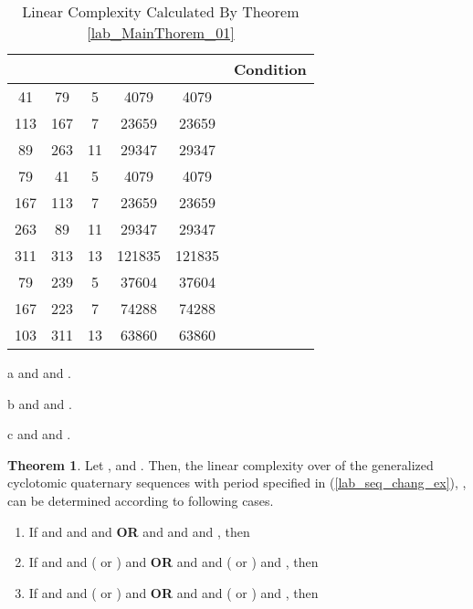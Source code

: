 \documentclass{mcom-l}
\theoremstyle{definition}
\newtheorem{sec3thm1x}[sec3thm1]{Theorem}
\numberwithin{equation}{section}
\begin{document}
      \begin{table}[!t]
         \begin{threeparttable}[t]
         \renewcommand{\arraystretch}{1.3}
         \caption{Linear Complexity Calculated By Theorem \ref{lab_MainThorem_01}}
         \label{Lab_Table2}
         \centering
         \begin{tabular}{c|c|c|c|c|c}
         \hline
         &  &  &  &  & \textbf{Condition}\\
         \hline
         41 & 79 & 5 & 4079 & 4079 & \tnote{a} \\
         \hline
         113 & 167 & 7 & 23659 & 23659 &  \\
         \hline
         89 & 263 & 11 & 29347 & 29347 &  \\
         \hline
         79 & 41 & 5 & 4079 & 4079 & \tnote{b} \\
         \hline
         167 & 113 & 7 & 23659 & 23659 &  \\
         \hline
         263 & 89 & 11 & 29347 & 29347 &  \\
         \hline
         311 & 313 & 13 & 121835 & 121835 &  \\
         \hline
         79 & 239 & 5 & 37604 & 37604 & \tnote{c} \\
         \hline
         167 & 223 & 7 & 74288 & 74288 &  \\
         \hline
         103 & 311 & 13 & 63860 & 63860 &  \\
         \hline
         \end{tabular}
         \begin{tablenotes}
         \item [a]  and  and .
         \item [b]  and  and .
         \item [c]  and  and .
         \end{tablenotes}
         \end{threeparttable}
         \end{table}
   \begin{sec3thm1x}\label{lab_MainThorem_01x}
     Let ,  and . Then, the linear complexity over  of the generalized cyclotomic quaternary sequences with period  specified in (\ref{lab_seq_chang_ex}), , can be determined according to following cases.
      \begin{enumerate} \item If  and  and  and  \textbf{OR}  and  and  and , then
      
       \item If  and  and ( or ) and  \textbf{OR}  and  and ( or ) and , then
          
       \item If  and  and ( or ) and  \textbf{OR}  and  and ( or ) and , then
            
            \end{enumerate}
     \end{sec3thm1x}
\end{document}
